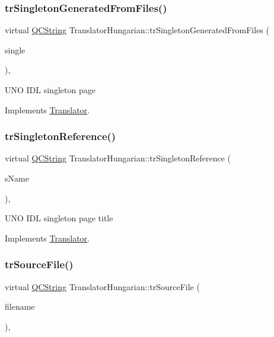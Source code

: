 \subsubsection{\texorpdfstring{trSingletonGeneratedFromFiles()}{trSingletonGeneratedFromFiles()}}
{\footnotesize\ttfamily virtual \mbox{\hyperlink{class_q_c_string}{Q\+C\+String}} Translator\+Hungarian\+::tr\+Singleton\+Generated\+From\+Files (\begin{DoxyParamCaption}\item[{bool}]{single }\end{DoxyParamCaption})\hspace{0.3cm}{\ttfamily [inline]}, {\ttfamily [virtual]}}

U\+NO I\+DL singleton page 

Implements \mbox{\hyperlink{class_translator}{Translator}}.

\mbox{\label{class_translator_hungarian_ab4473983ec1cecc514f01e11709d1d7d}} 
\subsubsection{\texorpdfstring{trSingletonReference()}{trSingletonReference()}}
{\footnotesize\ttfamily virtual \mbox{\hyperlink{class_q_c_string}{Q\+C\+String}} Translator\+Hungarian\+::tr\+Singleton\+Reference (\begin{DoxyParamCaption}\item[{const char $\ast$}]{s\+Name }\end{DoxyParamCaption})\hspace{0.3cm}{\ttfamily [inline]}, {\ttfamily [virtual]}}

U\+NO I\+DL singleton page title 

Implements \mbox{\hyperlink{class_translator}{Translator}}.

\mbox{\label{class_translator_hungarian_a4ac0c0115d6fff54cb5c66bb0147c598}} 
\subsubsection{\texorpdfstring{trSourceFile()}{trSourceFile()}}
{\footnotesize\ttfamily virtual \mbox{\hyperlink{class_q_c_string}{Q\+C\+String}} Translator\+Hungarian\+::tr\+Source\+File (\begin{DoxyParamCaption}\item[{\mbox{\hyperlink{class_q_c_string}{Q\+C\+String}} \&}]{filename }\end{DoxyParamCaption})\hspace{0.3cm}{\ttfamily [inline]}, {\ttfamily [virtual]}}

